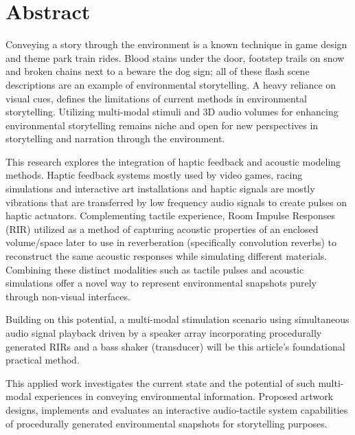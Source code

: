 \chapter*{Abstract}
    Conveying a story through the environment is a known technique in game design and theme park train rides\cite{Liminal_Space_Between_Embedded_and_Emergent_Narrative}. Blood stains under the door, footstep trails on snow and broken chains next to a beware the dog sign; all of these flash scene descriptions are an example of environmental storytelling. A heavy reliance on visual cues, defines the limitations of current methods in environmental storytelling. Utilizing multi-modal stimuli and 3D audio volumes for enhancing environmental storytelling remains niche and open for new perspectives in storytelling and narration through the environment.\par

    This research explores the integration of haptic feedback and acoustic modeling methods. Haptic feedback systems mostly used by video games, racing simulations and interactive art installations and haptic signals are mostly vibrations that are transferred by low frequency audio signals to create pulses on haptic actuators. Complementing tactile experience, Room Impulse Responses (RIR) utilized as a method of capturing acoustic properties of an enclosed volume/space\cite{Room_Acoustics} later to use in reverberation (specifically convolution reverbs) to reconstruct the same acoustic responses while simulating different materials. Combining these distinct modalities such as tactile pulses and acoustic simulations offer a novel way to represent environmental snapshots purely through non-visual interfaces.\par
    
    Building on this potential, a multi-modal stimulation scenario using simultaneous audio signal playback driven by a speaker array incorporating procedurally generated RIRs and a bass shaker (transducer) will be this article's foundational practical method. \par
    
    This applied work investigates the current state and the potential of such multi-modal experiences in conveying environmental information. Proposed artwork designs, implements and evaluates an interactive audio-tactile system capabilities of procedurally generated environmental snapshots for storytelling purposes.\par